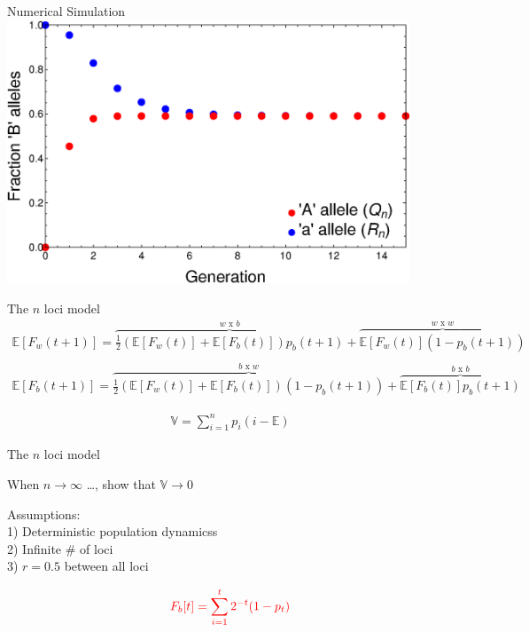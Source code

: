 \documentclass{beamer}
\begin{document}
\begin{frame}{Numerical Simulation}
\includegraphics[width=0.9\textwidth]{Figures/NumericalSolution.eps}

\end{frame}

\begin{frame}{The $n$ loci model}
\footnotesize
\begin{equation}
    \begin{array}{l}
	\mathbb{E}[F_w(t+1)] = \overbrace{\frac{1}{2} (\mathbb{E}[F_w(t)]+\mathbb{E}[F_b(t)]) p_b(t+1)}^\text{$w$ x $b$}  + \overbrace{\mathbb{E}[F_w(t)] (1-p_b(t+1))}^\text{$w$ x $w$}
	 \\ \\
	\mathbb{E}[F_b(t+1)]  = \overbrace{\frac{1}{2} (\mathbb{E}[F_w(t)]+\mathbb{E}[F_b(t)]) (1-p_b(t+1))}^\text{$b$ x $w$} 
	+ \overbrace{\mathbb{E}[F_b(t)] p_b(t+1)}^\text{$b$ x $b$}
	\end{array}
\end{equation}

\begin{equation}
    \begin{array}{l}
	\mathbb{V} = \sum_{i=1}^{n} p_i(i-\mathbb{E})
	\end{array}
\end{equation}
\normalsize
\end{frame}

\begin{frame}{The $n$ loci model}

When $n \to \infty$ \dots, show that $\mathbb{V} \to 0$
\vfill

Assumptions: \\
1) Deterministic population dynamicss \\
2) Infinite \# of loci \\
3) $r = 0.5$ between all loci 
    
\begin{equation*}
    \color{red} F_b[t] = \sum_{i=1}^t 2^{-t} (1-p_t)
\end{equation*}
\end{frame}
\end{document}
